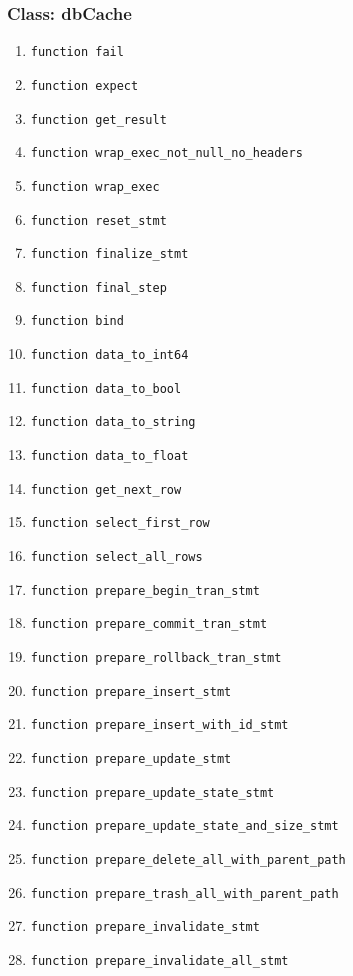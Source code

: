 \subsubsection{Class: dbCache}
\begin{enumerate}
    \item \verb|function fail|
    \item \verb|function expect|
    \item \verb|function get_result|
    \item \verb|function wrap_exec_not_null_no_headers|
    \item \verb|function wrap_exec|
    \item \verb|function reset_stmt|
    \item \verb|function finalize_stmt|
    \item \verb|function final_step|
    \item \verb|function bind|
    \item \verb|function data_to_int64|
    \item \verb|function data_to_bool|
    \item \verb|function data_to_string|
    \item \verb|function data_to_float|
    \item \verb|function get_next_row|
    \item \verb|function select_first_row|
    \item \verb|function select_all_rows|
    \item \verb|function prepare_begin_tran_stmt|
    \item \verb|function prepare_commit_tran_stmt|
    \item \verb|function prepare_rollback_tran_stmt|
    \item \verb|function prepare_insert_stmt|
    \item \verb|function prepare_insert_with_id_stmt|
    \item \verb|function prepare_update_stmt|
    \item \verb|function prepare_update_state_stmt|
    \item \verb|function prepare_update_state_and_size_stmt|
    \item \verb|function prepare_delete_all_with_parent_path|
    \item \verb|function prepare_trash_all_with_parent_path|
    \item \verb|function prepare_invalidate_stmt|
    \item \verb|function prepare_invalidate_all_stmt|

\end{enumerate}
